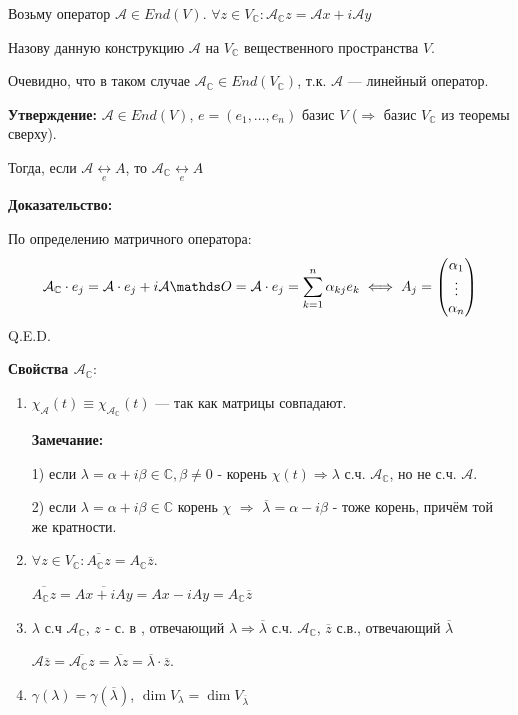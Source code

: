  Возьму оператор $\mathcal{A} \in End(V)$.  $\forall z \in V_{\mathbb{C}}: \mathcal{A}_{\mathbb{C}}z =\mathcal{A}x + i \mathcal{A}y$ 

Назову данную конструкцию  $\mathcal{A}$ на $V_{\mathbb{C}}$ вещественного пространства $V$.

Очевидно, что в таком случае $\mathcal{A}_\mathbb{C} \in End(V_{\mathbb{C}})$, т.к. $\mathcal{A}$ --- линейный оператор.

\textbf{Утверждение:} $\mathcal{A} \in End(V)$, $e = (e_1,\ldots, e_n) $ базис $V$ ($\Rightarrow$ базис $V_{\mathbb{C}}$ из теоремы сверху). 


Тогда, если $\mathcal{A} \underset{e} \leftrightarrow A$, то $ \mathcal{A}_{\mathbb{C}} \underset{e} \leftrightarrow A$

\textbf{Доказательство:}

По определению матричного оператора:
$$\mathcal{A}_{\mathbb{C}}  \cdot e_j = \mathcal{A}  \cdot e_j + i\mathcal{A} \zero = \mathcal{A} \cdot e_j =\sum\limits_{k=1}^n \alpha_{kj}e_k \iff A_j = \begin{pmatrix}
    \alpha_1\\
    \vdots \\
    \alpha_n
\end{pmatrix}$$
\hfill Q.E.D.


\textbf{Свойства $\mathcal{A_\mathbb{C}}$}:

\begin{enumerate}
   \item $\chi_{\mathcal{A}} (t) \equiv \chi_\mathcal{A_\mathbb{C}}(t)$ --- так как матрицы совпадают.

    \textbf{Замечание:} 
    
    1) если $\lambda = \alpha + i\beta \in \mathbb{C}, \beta \neq 0$ - корень $\chi(t) \Rightarrow \lambda$ с.ч. $\mathcal{A_\mathbb{C}}$, но не с.ч. $\mathcal{A}$.

   2) если $\lambda = \alpha + i\beta \in \mathbb{C}$ корень $\chi$ $\Rightarrow$ $\overline{\lambda}=\alpha - i\beta$ - тоже корень, причём той же кратности.

    \item $\forall z \in V_{\mathbb{C}}: \overline{A_{\mathbb{C}}z } = A_{\mathbb{C}}\overline{z}$.

     $\overline{A_{\mathbb{C}}z} = \overline{Ax + iAy} = Ax - iAy = A_{\mathbb{C}}\overline{z}$

    \item $\lambda$ с.ч $\mathcal{A_\mathbb{C}} $, $z$ - с. в , отвечающий $\lambda \Rightarrow \overline{\lambda}$ с.ч. $\mathcal{A_\mathbb{C}}$, $\overline{z}$ с.в., отвечающий $\overline{\lambda}$

    $\mathcal{A}\overline{z} = \overline{\mathcal{A}_{\mathbb{C}}z} = \overline{\lambda z} = \overline{\lambda} \cdot \overline{z}$.

    \item $\gamma(\lambda) = \gamma(\overline{\lambda})$, $\dim V_{\lambda} = \dim V_{\overline{\lambda}}$
\end{enumerate}

